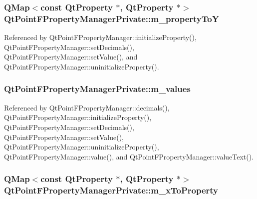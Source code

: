 \subsubsection[{m\+\_\+property\+ToY}]{\setlength{\rightskip}{0pt plus 5cm}Q\+Map$<$const {\bf Qt\+Property} $\ast$, {\bf Qt\+Property} $\ast$$>$ Qt\+Point\+F\+Property\+Manager\+Private\+::m\+\_\+property\+ToY}\label{classQtPointFPropertyManagerPrivate_ad7c9724c95a58617ec7669b9cf37085b}


Referenced by Qt\+Point\+F\+Property\+Manager\+::initialize\+Property(), Qt\+Point\+F\+Property\+Manager\+::set\+Decimals(), Qt\+Point\+F\+Property\+Manager\+::set\+Value(), and Qt\+Point\+F\+Property\+Manager\+::uninitialize\+Property().

\subsubsection[{m\+\_\+values}]{ Qt\+Point\+F\+Property\+Manager\+Private\+::m\+\_\+values}\label{classQtPointFPropertyManagerPrivate_a08fd87ecee53c6f5e982c8ff3b9d0578}


Referenced by Qt\+Point\+F\+Property\+Manager\+::decimals(), Qt\+Point\+F\+Property\+Manager\+::initialize\+Property(), Qt\+Point\+F\+Property\+Manager\+::set\+Decimals(), Qt\+Point\+F\+Property\+Manager\+::set\+Value(), Qt\+Point\+F\+Property\+Manager\+::uninitialize\+Property(), Qt\+Point\+F\+Property\+Manager\+::value(), and Qt\+Point\+F\+Property\+Manager\+::value\+Text().

\subsubsection[{m\+\_\+x\+To\+Property}]{\setlength{\rightskip}{0pt plus 5cm}Q\+Map$<$const {\bf Qt\+Property} $\ast$, {\bf Qt\+Property} $\ast$$>$ Qt\+Point\+F\+Property\+Manager\+Private\+::m\+\_\+x\+To\+Property}\label{classQtPointFPropertyManagerPrivate_a7771cc813aab9d0c3bada12bbec91dd7}


